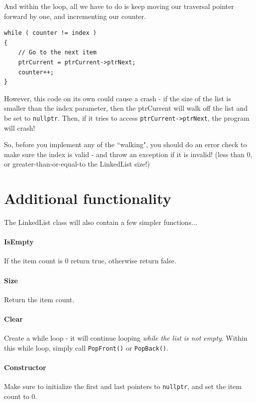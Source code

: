 \documentclass[a4paper,12pt,oneside]{book}
\begin{document}
    And within the loop, all we have to do is keep moving our traversal
    pointer forward by one, and incrementing our counter.
    
\begin{lstlisting}[style=code]
while ( counter != index )
{
    // Go to the next item
    ptrCurrent = ptrCurrent->ptrNext; 
    counter++;
}
\end{lstlisting} 

    However, this code on its own could cause a crash - if the size
    of the list is smaller than the index parameter, then the 
    ptrCurrent will walk off the list and be set to \texttt{nullptr}.
    Then, if it tries to access \texttt{ptrCurrent->ptrNext}, the program
    will crash!
    
    So, before you implement any of the ``walking", you should do an error
    check to make sure the index is valid - and throw an exception if
    it is invalid! (less than 0, or greater-than-or-equal-to the LinkedList size!)
    
    
    \section{Additional functionality}
    
    The LinkedList class will also contain a few simpler functions...
    
    \paragraph{IsEmpty} If the item count is 0 return true, otherwise return false.
    
    \paragraph{Size} Return the item count.
    
    \paragraph{Clear}
    Create a while loop - it will continue looping \textit{while
    the list is not empty}. Within this while loop, simply call
    \texttt{PopFront()} or \texttt{PopBack()}.
    
    \paragraph{Constructor} Make sure to initialize the first and last
    pointers to \texttt{nullptr}, and set the item count to 0.
    
\end{document}
